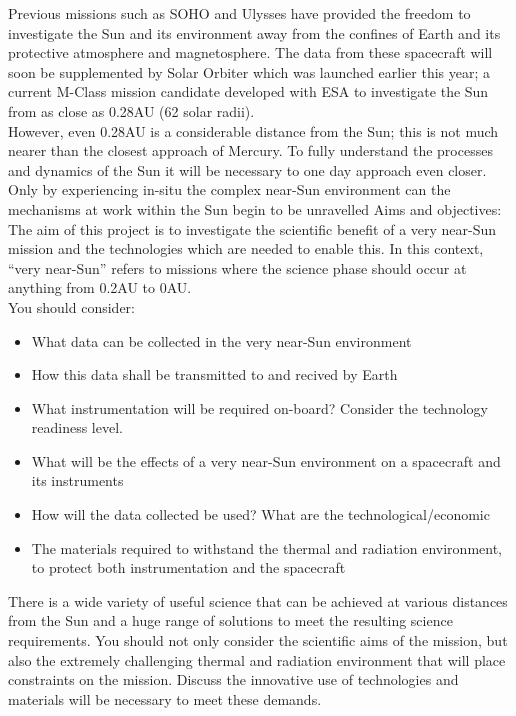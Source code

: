 \documentclass[12pt]{article}
\begin{document}
Previous missions such as SOHO and Ulysses have provided the freedom to investigate the Sun and its environment away from the confines of Earth and its protective atmosphere and magnetosphere. The data from these spacecraft will soon be supplemented by Solar Orbiter which was launched earlier this year; a current M-Class mission candidate developed with ESA to investigate the Sun from as close as 0.28AU (62 solar radii). \\

However, even 0.28AU is a considerable distance from the Sun; this is not much nearer than the closest approach of Mercury. To fully understand the processes and dynamics of the Sun it will be necessary to one day approach even closer.  Only by experiencing in-situ the complex near-Sun environment can the mechanisms at work within the Sun begin to be unravelled
Aims and objectives: \\

The aim of this project is to investigate the scientific benefit of a very near-Sun mission and the technologies which are needed to enable this. In this context, “very near-Sun” refers to missions where the science phase should occur at anything from 0.2AU to 0AU. \\

You should consider: 
\begin{itemize}
    \item What data can be collected in the very near-Sun environment
    \item How this data shall be transmitted to and recived by Earth
    \item What instrumentation will be required on-board? Consider the technology readiness level.
    \item What will be the effects of a very near-Sun environment on a spacecraft and its instruments 
    \item How will the data collected be used? What are the technological/economic 
    \item The materials required to withstand the thermal and radiation environment, to protect both instrumentation and the spacecraft 
\end{itemize}

There is a wide variety of useful science that can be achieved at various distances from the Sun and a huge range of solutions to meet the resulting science requirements. You should not only consider  the scientific aims of the mission, but also the extremely challenging thermal and radiation environment that will place constraints on the mission. Discuss the innovative use of technologies and materials will be necessary to meet these demands. \\
\end{document}
